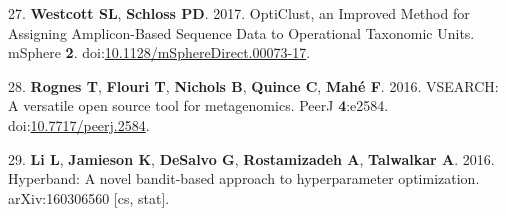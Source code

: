 \documentclass[11pt,]{article}
\begin{document}
\hypertarget{ref-westcott_opticlust_2017}{}
27. \textbf{Westcott SL}, \textbf{Schloss PD}. 2017. OptiClust, an
Improved Method for Assigning Amplicon-Based Sequence Data to
Operational Taxonomic Units. mSphere \textbf{2}.
doi:\href{https://doi.org/10.1128/mSphereDirect.00073-17}{10.1128/mSphereDirect.00073-17}.

\hypertarget{ref-rognes_vsearch_2016}{}
28. \textbf{Rognes T}, \textbf{Flouri T}, \textbf{Nichols B},
\textbf{Quince C}, \textbf{Mahé F}. 2016. VSEARCH: A versatile open
source tool for metagenomics. PeerJ \textbf{4}:e2584.
doi:\href{https://doi.org/10.7717/peerj.2584}{10.7717/peerj.2584}.

\hypertarget{ref-li_hyperband:_2016}{}
29. \textbf{Li L}, \textbf{Jamieson K}, \textbf{DeSalvo G},
\textbf{Rostamizadeh A}, \textbf{Talwalkar A}. 2016. Hyperband: A novel
bandit-based approach to hyperparameter optimization. arXiv:160306560
{[}cs, stat{]}.
\end{document}
